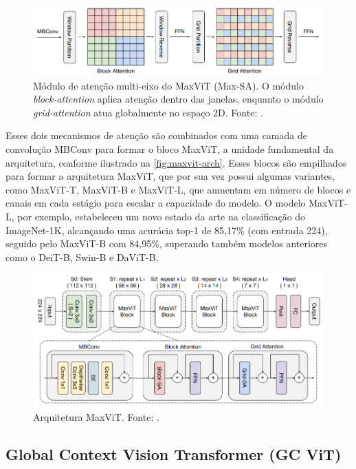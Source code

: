 \begin{figure}[h]
    \centering
    \includegraphics[width=\linewidth]{figs/max-sa.png}
    \caption{Módulo de atenção multi-eixo do MaxViT (Max-SA). O módulo \textit{block-attention} aplica atenção dentro das janelas, enquanto o módulo \textit{grid-attention} atua globalmente no espaço 2D. Fonte: \cite{maxvit2022}.}
    \label{fig:max-sa}
\end{figure}

Esses dois mecanismos de atenção são combinados com uma camada de convolução MBConv para formar o bloco MaxViT, a unidade fundamental da arquitetura, conforme ilustrado na \autoref{fig:maxvit-arch}. Esses blocos são empilhados para formar a arquitetura MaxViT, que por sua vez possui algumas variantes, como MaxViT-T, MaxViT-B e MaxViT-L, que aumentam em número de blocos e canais em cada estágio para escalar a capacidade do modelo. O modelo MaxViT-L, por exemplo, estabeleceu um novo estado da arte na classificação do ImageNet-1K, alcançando uma acurácia top-1 de 85,17\% (com entrada 224), seguido pelo MaxViT-B com 84,95\%, superando também modelos anteriores como o DeiT-B, Swin-B e DaViT-B.

\begin{figure}[h]
    \centering
    \includegraphics[width=\linewidth]{figs/maxvit-arch.png}
    \caption{Arquitetura MaxViT. Fonte: \cite{maxvit2022}.}
    \label{fig:maxvit-arch}
\end{figure}

\subsection{Global Context Vision Transformer (GC ViT)}

